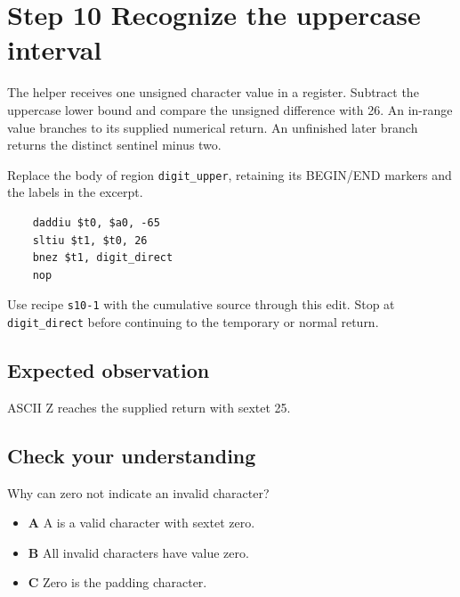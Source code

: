\section{Step 10 Recognize the uppercase interval}\label{base64-s10}

The helper receives one unsigned character value in a register. Subtract the uppercase lower bound and compare the unsigned difference with 26. An in-range value branches to its supplied numerical return. An unfinished later branch returns the distinct sentinel minus two.

Replace the body of region \texttt{digit\_upper}, retaining its BEGIN/END markers and the labels in the excerpt.

\begin{verbatim}
    daddiu $t0, $a0, -65
    sltiu $t1, $t0, 26
    bnez $t1, digit_direct
    nop
\end{verbatim}

Use recipe \texttt{s10-1} with the cumulative source through this edit. Stop at \texttt{digit\_direct} before continuing to the temporary or normal return.

\subsection{Expected observation}
ASCII Z reaches the supplied return with sextet 25.

\subsection{Check your understanding}
Why can zero not indicate an invalid character?

\begin{itemize}
  \item \textbf{A} A is a valid character with sextet zero.
  \item \textbf{B} All invalid characters have value zero.
  \item \textbf{C} Zero is the padding character.
\end{itemize}
